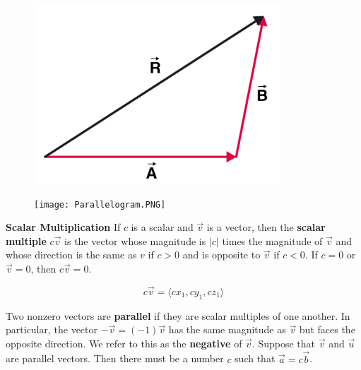         \begin{figure}[h]
            \centering
            \begin{minipage}{.5\textwidth}
                \centering
                \includegraphics[scale=0.3]{Resources/Unit3Vectors/Triangle.PNG}
            \end{minipage}%
            \begin{minipage}{.5\textwidth}
                \centering
                \texttt{[image: Parallelogram.PNG]}
            \end{minipage}
        \end{figure}

        \noindent \textbf{Scalar Multiplication} If $c$ is a scalar and $\overrightarrow{v}$ is
        a vector, then the \textbf{scalar multiple} $c\overrightarrow{v}$ is the vector whose
        magnitude is $|c|$ times the magnitude of $\overrightarrow{v}$ and whose direction is
        the same as $v$ if $c>0$ and is opposite to $\overrightarrow{v}$ if $c<0$. If $c=0$ or
        $\overrightarrow{v}=0$, then $c\overrightarrow{v}=0$.

        \begin{equation}
            c\overrightarrow{v}=\langle cx_1, cy_1, cz_1 \rangle
        \end{equation}

        \noindent Two nonzero vectors are \textbf{parallel} if they are scalar multiples of one
        another. In particular, the vector $-\overrightarrow{v}=(-1)\overrightarrow{v}$ has the
        same magnitude as $\overrightarrow{v}$ but faces the opposite direction. We refer to
        this as the \textbf{negative} of $\overrightarrow{v}$. Suppose that $\overrightarrow{v}$
        and $\overrightarrow{u}$ are parallel vectors. Then there must be a number $c$ such that
        $\overrightarrow{a}=c\overrightarrow{b}$.

